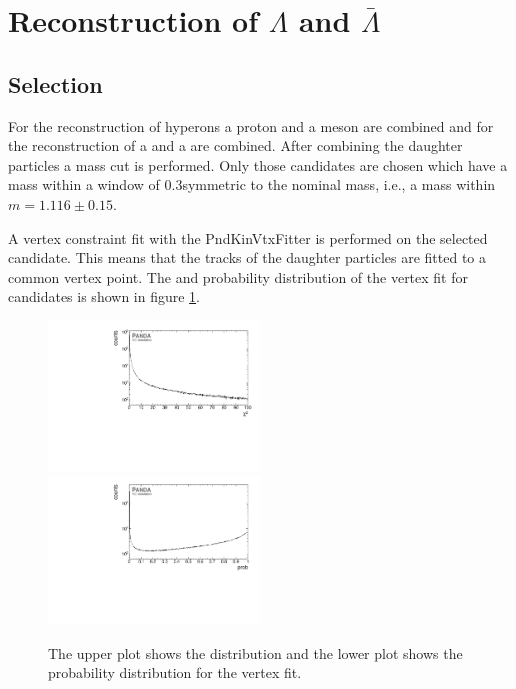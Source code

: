 	
\section{Reconstruction of $\Lambda$ and $\bar{\Lambda}$}\label{subsec:lambda}
	\subsection*{Selection}
		For the reconstruction of \lam hyperons a proton and a \piminus meson are combined and for the reconstruction 
		of \alam a \antiproton and a \piplus are combined.		 
		After combining the daughter particles a mass cut is performed.
		Only those candidates are chosen which have a mass within a window of $0.3$\massunit symmetric to the nominal 
		\lam mass, i.e., a mass within $m= 1.116\pm 0.15$\massunit.
		
		
		A vertex constraint fit with the PndKinVtxFitter is performed on the selected candidate.
		This means that the tracks of the daughter particles are fitted to a common vertex point.  
		The \chisq and probability distribution of the vertex fit for \lam candidates is shown in figure \ref{fig:lambda_chi2}.
		
		\begin{figure}
			\centering
				\includegraphics[width=0.50\textwidth]{./plots/lambda0/lambda0_chi2.pdf}
				\includegraphics [width=0.50\textwidth]{./plots/lambda0/lambda0_prob.pdf}
			\caption{\propose The upper plot shows the  \chisq distribution and the lower plot shows the probability distribution for the \lam vertex fit.}
			\label{fig:lambda_chi2}
		\end{figure}
		
